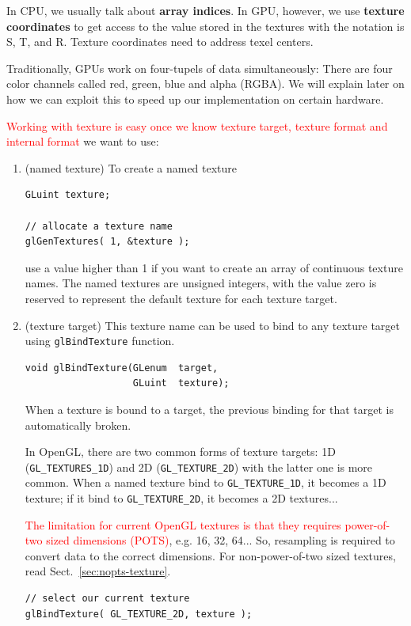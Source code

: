 In CPU, we usually talk about {\bf array indices}. In GPU, however, we
use {\bf texture coordinates} to get access to the value stored in the
textures with the notation is S, T, and R. Texture coordinates need to
address texel centers.

\begin{framed}
  Traditionally, GPUs work on four-tupels of data simultaneously:
  There are four color channels called red, green, blue and alpha
  (RGBA). We will explain later on how we can exploit this to speed up
  our implementation on certain hardware.
\end{framed}


\textcolor{red}{Working with texture is easy once we know texture
  target, texture format and internal format} we want to use:

\begin{enumerate}
\item (named texture) To create a named texture
\begin{verbatim}
GLuint texture;

// allocate a texture name
glGenTextures( 1, &texture );
\end{verbatim}
  use a value higher than 1 if you want to create an array of
  continuous texture names.  The named textures are unsigned integers,
  with the value zero is reserved to represent the default texture for
  each texture target.

\item (texture target) This texture name can be used to bind to any texture target
  using \verb!glBindTexture! function. 
\begin{verbatim}
void glBindTexture(GLenum  target, 
                   GLuint  texture);
\end{verbatim}
  When a texture is bound to a target, the previous binding for that
  target is automatically broken. 
  
  In OpenGL, there are two common forms of texture targets: 1D
  (\verb!GL_TEXTURES_1D!) and 2D (\verb!GL_TEXTURE_2D!) with the
  latter one is more common.  When a named texture bind to
  \verb!GL_TEXTURE_1D!, it becomes a 1D texture; if it bind to
  \verb!GL_TEXTURE_2D!, it becomes a 2D textures...

  \textcolor{red}{The limitation for current OpenGL textures is that
    they requires power-of-two sized dimensions (POTS)},
  e.g. 16, 32, 64... So, resampling is required to convert data to the
  correct dimensions. For non-power-of-two sized textures, read
  Sect.~\ref{sec:nopts-texture}.
\begin{verbatim}
// select our current texture
glBindTexture( GL_TEXTURE_2D, texture );
\end{verbatim}


\end{enumerate}
